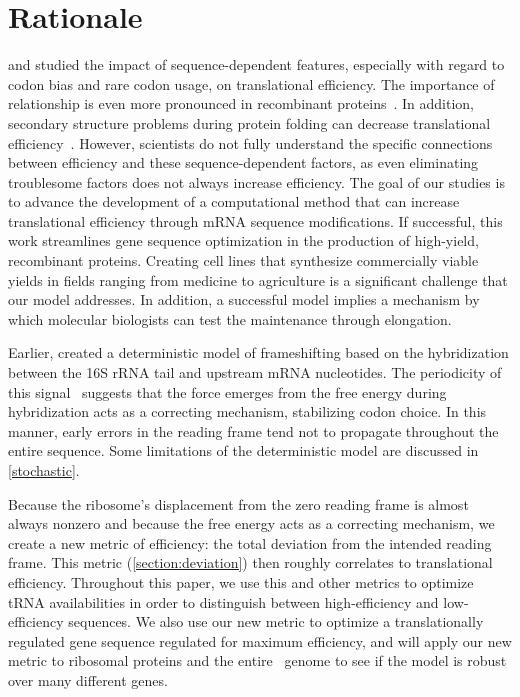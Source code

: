 \documentclass[12pt]{article}
\numberwithin{equation}{section}
\begin{document}
\section{Rationale}
\citet{lalit:mechanics} and \citet{kane95} studied the impact
of sequence-dependent features, especially with regard to codon bias 
and rare codon usage, on translational efficiency.  The importance of 
relationship is even more pronounced in recombinant 
proteins~\cite{sorensen05}.  In addition, secondary structure problems 
during protein folding can decrease translational 
efficiency~\cite{kozak05}.  However, scientists do not fully
understand the specific connections between efficiency and these
sequence-dependent factors, as even eliminating troublesome factors
does not always increase efficiency. The goal of our studies is to
advance the development of a computational method that can increase
translational efficiency through mRNA sequence modifications. If
successful, this work streamlines gene sequence optimization in the
production of high-yield, recombinant proteins. Creating cell lines
that synthesize commercially viable yields in fields ranging from
medicine to agriculture is a significant challenge that our model
addresses. In addition, a successful model implies a mechanism by
which molecular biologists can test the maintenance through
elongation.

Earlier, \citet{lalit:jbsb} created a deterministic model of
frameshifting based on the hybridization between the 16S rRNA tail and
upstream mRNA nucleotides.  The periodicity of this
signal~\cite{lalit:jbsb} suggests that the force emerges from the free
energy during hybridization acts as a correcting mechanism,
stabilizing codon choice.  In this manner, early errors in the reading
frame tend not to propagate throughout the entire sequence.  Some
limitations of the deterministic model are discussed in
\autoref{stochastic}.

Because the ribosome's displacement from the zero reading frame is
almost always nonzero and because the free energy acts as a correcting
mechanism, we create a new metric of efficiency: the total deviation
from the intended reading frame.  This metric
(\autoref{section:deviation}) then roughly correlates to translational
efficiency.  Throughout this paper, we use this and other metrics to
optimize tRNA availabilities in order to distinguish between
high-efficiency and low-efficiency sequences. We also use our new
metric to optimize a translationally regulated gene sequence
regulated for maximum efficiency, and will apply our new metric to
ribosomal proteins and the entire \ecoli\ genome to see if the model
is robust over many different genes.
\end{document}
